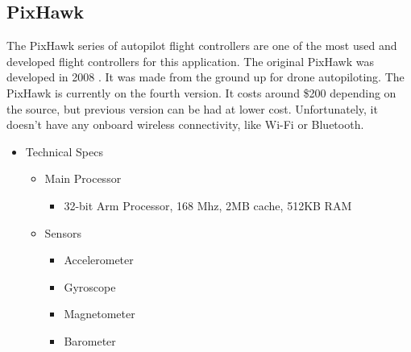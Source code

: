 \documentclass[onecolumn, 10pt, compsoc]{IEEEtran}
\begin{document}
\subsection{PixHawk}
The PixHawk series of autopilot flight controllers are one of the most used and developed flight controllers for this application. The original PixHawk was developed in 2008 \cite{HistoryPixHawk}. It was made from the ground up for drone autopiloting. The PixHawk is currently on the fourth version. It costs around \$200 \cite{PixHawkPrice} depending on the source, but previous version can be had at lower cost. Unfortunately, it doesn’t have any onboard wireless connectivity, like Wi-Fi or Bluetooth. 
\begin{itemize}
    \item Technical Specs \cite{PixHawkSpecs}
    \begin{itemize}
        \item Main Processor
        \begin{itemize}
            \item 32-bit Arm Processor, 168 Mhz, 2MB cache, 512KB RAM
        \end{itemize}
        \item Sensors
        \begin{itemize}
            \item Accelerometer
            \item Gyroscope
            \item Magnetometer
            \item Barometer
        \end{itemize}
    \end{itemize}
\end{itemize}
\end{document}
